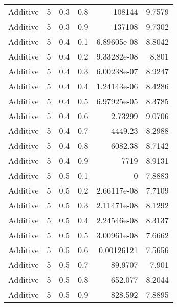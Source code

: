 \documentclass{article}
\begin{document}
\begin{longtable}[H]{lrrrrr}
 Additive       &       5 &   0.3 &            0.8 & 108144           &          9.7579 \\
 Additive       &       5 &   0.3 &            0.9 & 137108           &          9.7302 \\
 Additive       &       5 &   0.4 &            0.1 &      6.89605e-08 &          8.8042 \\
 Additive       &       5 &   0.4 &            0.2 &      9.33282e-08 &          8.801  \\
 Additive       &       5 &   0.4 &            0.3 &      6.00238e-07 &          8.9247 \\
 Additive       &       5 &   0.4 &            0.4 &      1.24143e-06 &          8.4286 \\
 Additive       &       5 &   0.4 &            0.5 &      6.97925e-05 &          8.3785 \\
 Additive       &       5 &   0.4 &            0.6 &      2.73299     &          9.0706 \\
 Additive       &       5 &   0.4 &            0.7 &   4449.23        &          8.2988 \\
 Additive       &       5 &   0.4 &            0.8 &   6082.38        &          8.7142 \\
 Additive       &       5 &   0.4 &            0.9 &   7719           &          8.9131 \\
 Additive       &       5 &   0.5 &            0.1 &      0           &          7.8883 \\
 Additive       &       5 &   0.5 &            0.2 &      2.66117e-08 &          7.7109 \\
 Additive       &       5 &   0.5 &            0.3 &      2.11471e-08 &          8.1292 \\
 Additive       &       5 &   0.5 &            0.4 &      2.24546e-08 &          8.3137 \\
 Additive       &       5 &   0.5 &            0.5 &      3.00961e-08 &          7.6662 \\
 Additive       &       5 &   0.5 &            0.6 &      0.00126121  &          7.5656 \\
 Additive       &       5 &   0.5 &            0.7 &     89.9707      &          7.901  \\
 Additive       &       5 &   0.5 &            0.8 &    652.077       &          8.2044 \\
 Additive       &       5 &   0.5 &            0.9 &    828.592       &          7.8895 \\

\end{longtable}
\end{document}
